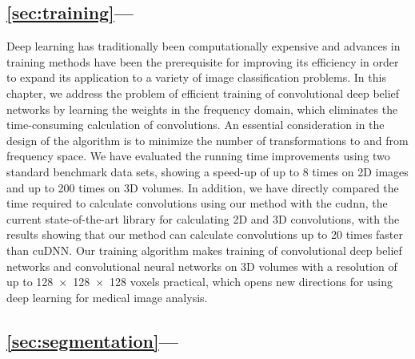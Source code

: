 \subsection*{\ref{sec:training}---}

Deep learning has traditionally been computationally expensive and advances in
training methods have been the prerequisite for improving its efficiency in
order to expand its application to a variety of image classification problems.
In this chapter, we address the problem of efficient training of convolutional
deep belief networks by learning the weights in the frequency domain, which
eliminates the time-consuming calculation of convolutions. An essential
consideration in the design of the algorithm is to minimize the number of
transformations to and from frequency space. We have evaluated the running time
improvements using two standard benchmark data sets, showing a speed-up of up to
8 times on 2D images and up to 200 times on 3D volumes. In addition, we have
directly compared the time required to calculate convolutions using our method
with the \gls{cudnn}, the current state-of-the-art library for calculating 2D
and 3D convolutions, with the results showing that our method can calculate
convolutions up to 20 times faster than cuDNN. Our training algorithm makes
training of convolutional deep belief networks and convolutional neural networks
on 3D volumes with a resolution of up to \num{128x128x128} voxels
practical, which opens new directions for using deep learning for medical image
analysis.

\subsection*{\ref{sec:segmentation}---}


